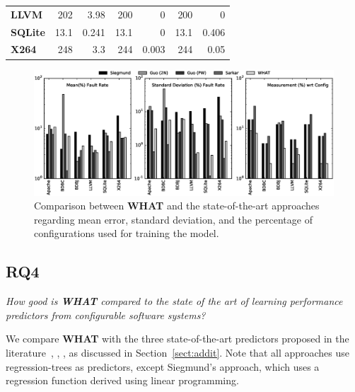 \documentclass{newsig}
\newcommand{\what}{{\bf WHAT }}
\begin{document}
\begin{table}[tbh]
\begin{tabular}{lrrrrrr}
\textbf{LLVM}                     & 202              & 3.98            & 200             & 0              & 200               & 0                \\ 
\textbf{SQLite}                   & 13.1             & 0.241           & 13.1            & 0              & 13.1              & 0.406            \\ 
\textbf{X264}                     & 248              & 3.3             & 244             & 0.003          & 244               & 0.05             \\ \bottomrule
\end{tabular}
\end{table}

\begin{figure}[tbh]
\includegraphics[width=\linewidth]{Figures/compare_graph_h}
\caption{Comparison between \what and the state-of-the-art approaches regarding mean error, standard deviation, and the percentage of configurations used for training the model.} \label{fig:Comparison}
\end{figure}

 
\subsection{RQ4}



 \begin{center}
{\em How good is \what compared to the state of the art of learning performance predictors from configurable software systems?}
\end{center}

We compare \what with the three state-of-the-art predictors proposed in the literature~\cite{siegmund2012predicting}, \cite{guo2013variability}, \cite{sarkar2015cost}, as discussed in Section~\ref{sect:addit}. Note that all approaches use regression-trees as predictors, except Siegmund's approach, which uses a regression function derived using linear programming.
 
\end{document}
